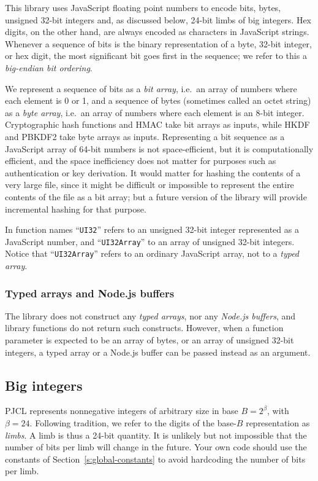 \documentclass[12pt]{article}
\begin{document}
This library uses JavaScript floating point numbers to encode bits, bytes, 
unsigned 32-bit integers and, as discussed below, 24-bit limbs of 
big integers.  Hex digits, on the other hand, are always encoded as 
characters in JavaScript strings.  Whenever a sequence of bits is the binary
representation of a byte, 32-bit integer, or hex digit, the most significant
bit goes first in the sequence; we refer to this a {\em big-endian bit ordering}.

We represent a sequence of bits as a {\em bit array}, 
i.e.\ an array of numbers where each element is 0 or 1, and a sequence
of bytes (sometimes called an octet string) as a {\em byte array}, 
i.e.\ an array of numbers where each element
is an 8-bit integer.  Cryptographic hash functions and HMAC take bit arrays
as inputs, while HKDF and PBKDF2 take byte arrays as inputs.  
Representing a bit sequence as a JavaScript array of
64-bit numbers is not space-efficient, but it is computationally efficient,
and the space inefficiency does not matter for purposes such as
authentication or key derivation.  It would matter for hashing the 
contents of a very large file, since it might be difficult or impossible 
to represent the entire contents of the file as a bit array; 
but a future version of the library will
provide incremental hashing for that purpose.

In function names ``{\tt UI32}'' refers to an unsigned 32-bit integer represented
as a JavaScript number, and ``{\tt UI32Array}'' to an array of unsigned 32-bit integers.
Notice that ``{\tt UI32Array}'' refers to an ordinary JavaScript array,
not to a {\em typed array}.

\subsubsection{Typed arrays and Node.js buffers}

The library does not
construct any {\em typed arrays}, nor any {\em Node.js buffers}, and library functions
do not return such constructs.  However, when a function parameter is
expected to be an array of bytes, or an array of unsigned 32-bit integers, a typed array
or a Node.js buffer can be passed instead as an argument.

\subsection{Big integers}
\label{s:big-integers}

PJCL represents nonnegative integers of arbitrary size in base $B =
2^\beta$, with $\beta = 24$.  Following tradition, we refer to the
digits of the base-$B$ representation as {\em limbs}.  A limb is thus
a 24-bit quantity.  It is unlikely but not impossible that the number of bits per limb
will change in the future.  Your own code should use the constants
of Section~\ref{s:global-constants} to avoid hardcoding the number of bits per limb.
\end{document}
